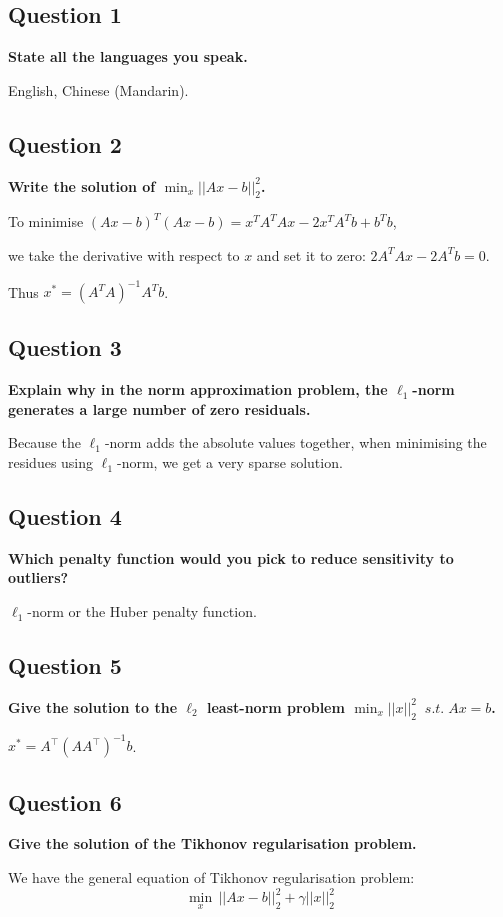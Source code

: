 \subsection*{Question 1}
\textbf{State all the languages you speak.}

English, Chinese (Mandarin).

\subsection*{Question 2}
\textbf{Write the solution of $\min_{x} ||Ax - b||^2_2$. }

To minimise $ (Ax - b)^T (Ax - b) = x^TA^TAx - 2x^TA^Tb + b^Tb $, 

we take the derivative with respect to $x$ and set it to zero: $ 2A^TAx - 2A^Tb = 0 $.

Thus $x^* = (A^T A)^{-1} A^T b$.

\subsection*{Question 3}
\textbf{Explain why in the norm approximation problem, the $\ell_1$-norm generates a large number of zero residuals.}

Because the \(\ell_1\)-norm adds the absolute values together, when minimising the residues using \(\ell_1\)-norm, we get a very sparse solution. 

\subsection*{Question 4}
\textbf{Which penalty function would you pick to reduce sensitivity to outliers?}

\(\ell_1\)-norm or the Huber penalty function. 

\subsection*{Question 5}
\textbf{Give the solution to the $\ell_2$ least-norm problem $\min_{x} || x ||_2^2 \; \; s.t. \; Ax = b$.}

$ x^* = A^{\top}(AA^{\top})^{-1}b $.

\subsection*{Question 6}
\textbf{Give the solution of the Tikhonov regularisation problem.}


We have the general equation of Tikhonov regularisation problem: $$ \min_{x} \, ||Ax - b||_2^2 + \gamma ||x||_2^2 $$

